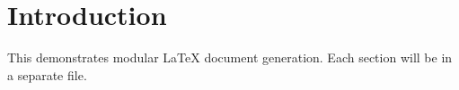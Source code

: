 \section{Introduction}
This demonstrates modular LaTeX document generation.
Each section will be in a separate file.